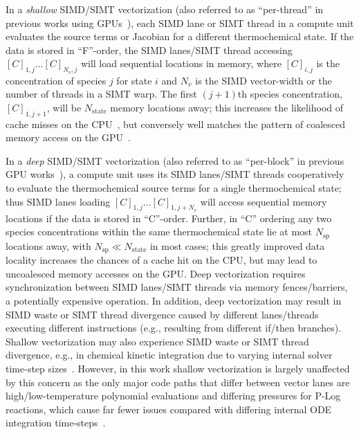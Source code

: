 \documentclass[12pt,number,sort&compress,preprint]{elsarticle}
\begin{document}
In a \textit{shallow} SIMD\slash SIMT vectorization (also referred to as ``per-thread'' in previous works using GPUs~\cite{Stone:2013aa}), each SIMD lane or SIMT thread in a compute unit evaluates the source terms or Jacobian for a different thermochemical state.
If the data is stored in ``F''-order, the SIMD lanes\slash SIMT thread accessing $[C]_{1, j}\ldots[C]_{N_v, j}$ will load sequential locations in memory, where $[C]_{i, j}$ is the concentration of species $j$ for state $i$ and $N_v$ is the SIMD vector-width or the number of threads in a SIMT warp.
The first $(j+1)$th species concentration, $[C]_{1, j+1}$, will be $N_{\text{state}}$ memory locations away; this increases the likelihood of cache misses on the CPU~\cite{gray2000rules}, but conversely well matches the pattern of coalesced memory access on the GPU~\cite{Nvidia:2018}.

In a \textit{deep} SIMD\slash SIMT vectorization (also referred to as ``per-block'' in previous GPU works~\cite{Stone:2013aa,CurtisGPU:2017}), a compute unit uses its SIMD lanes\slash SIMT threads cooperatively to evaluate the thermochemical source terms for a single thermochemical state; thus SIMD lanes loading $[C]_{1, j} \ldots [C]_{1, j + N_v}$ will access sequential memory locations if the data is stored in ``C''-order.
Further, in ``C'' ordering any two species concentrations within the same thermochemical state lie at most $N_{\text{sp}}$ locations away, with $N_{\text{sp}} \ll N_{\text{state}}$ in most cases; this greatly improved data locality increases the chances of a cache hit on the CPU, but may lead to uncoalesced memory accesses on the GPU.
 Deep vectorization requires synchronization between SIMD lanes\slash SIMT threads via memory fences\slash barriers, a potentially expensive operation.
In addition, deep vectorization may result in SIMD waste or SIMT thread divergence caused by different lanes\slash threads executing different instructions (e.g., resulting from different if\slash then branches).
Shallow vectorization may also experience SIMD waste or SIMT thread divergence, e.g., in chemical kinetic integration due to varying internal solver time-step sizes~\cite{CurtisGPU:2017}.
However, in this work shallow vectorization is largely unaffected by this concern as the only major code paths that differ between vector lanes are high\slash low-temperature polynomial evaluations and differing pressures for P-Log reactions, which cause far fewer issues compared with differing internal ODE integration time-steps~\cite{CurtisGPU:2017}.
\end{document}
